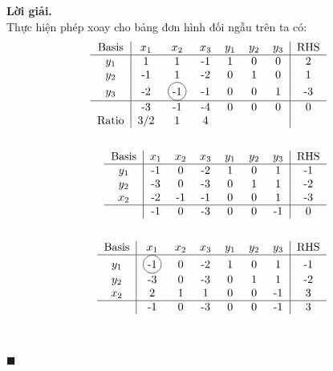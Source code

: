 \documentclass[12pt]{article}
\newcommand*\circled[1]{\tikz[baseline=(char.base)]{%
            \node[shape=circle,draw,inner sep=2pt] (char) {#1};}}
\newenvironment{solution}{%
     \setlength\parindent{0pt}\par\medskip\textbf{Lời giải.}\quad}{%
     \hfill\tiny$\blacksquare$\par\medskip}
\begin{document}
\begin{solution}
        \\
        Thực hiện phép xoay cho bảng đơn hình đối ngẫu trên ta có:
        \begin{align*}
            \begin{tabular}{c|cccccc|c}
                Basis &$x_1$ & $x_2$ & $x_3$ & $y_1$ & $y_2$ & $y_3$ & RHS \\ \hline
                $y_1$ & 1 & 1 & -1 & 1 & 0 & 0 & 2 \\
                $y_2$ & -1 & 1 & -2 & 0 & 1 & 0 & 1 \\
                $y_3$ & -2 & \circled{-1} & -1 & 0 & 0 & 1 & -3 \\ \hline
                & -3 & -1 & -4 & 0 & 0 & 0 & 0 \\
                Ratio & 3/2 & 1 & 4 &  &  &  & 
            \end{tabular}
            \\
            \\
            \begin{tabular}{c|cccccc|c}
                Basis &$x_1$ & $x_2$ & $x_3$ & $y_1$ & $y_2$ & $y_3$ & RHS \\ \hline
                $y_1$ &-1 & 0 & -2 & 1 & 0 & 1 & -1 \\
                $y_2$ &-3 & 0 & -3 & 0 & 1 & 1 & -2 \\
                $x_2$ &-2 & -1 & -1 & 0 & 0 & 1 & -3 \\ \hline
                &-1 & 0 & -3 & 0 & 0 & -1 & 0 \\
            \end{tabular}
            \\
            \\
            \begin{tabular}{c|cccccc|c}
                Basis &$x_1$ & $x_2$ & $x_3$ & $y_1$ & $y_2$ & $y_3$ & RHS \\ \hline
                $y_1$ & \circled{-1} & 0 & -2 & 1 & 0 & 1 & -1 \\
                $y_2$ & -3 & 0 & -3 & 0 & 1 & 1 & -2 \\
                $x_2$ & 2 & 1 & 1 & 0 & 0 & -1 & 3 \\ \hline
                & -1 & 0 & -3 & 0 & 0 & -1 & 3 \\
            \end{tabular}
            \\
            \\
            \begin{tabular}{c|cccccc|c}

\end{tabular}
\end{align*}
\end{solution}
\end{document}
